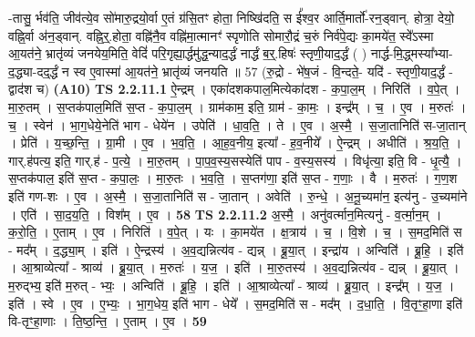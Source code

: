 \documentclass[17pt]{extarticle}
\begin{document}
                  \newline
                      -तासु॒ र्भव॑ति॒ जीव॑त्ये॒व सो॑मारु॒द्रयो॒र्वा ए॒तं ग्र॑सि॒तꣳ होता॒ निष्खि॑दति॒ स ई᳚श्व॒र आर्ति॒मार्तो॑-रन॒ड्वान्. होत्रा॒ देयो॒ वह्नि॒र्वा अ॑न॒ड्वान्. वह्नि॒र्॒.होता॒ वह्नि॑नै॒व वह्नि॑मा॒त्मानꣳ॑ स्पृणोति सोमारौ॒द्रं च॒रुं निर्व॑पे॒द्यः का॒मये॑त॒ स्वे᳚ऽस्मा आ॒यत॑ने॒ भ्रातृ॑व्यं जनयेय॒मिति॒ वेदिं॑ परि॒गृह्या॒र्द्धमु॑द्ध॒न्याद॒र्द्धं नार्द्धं ब॒र्॒.हिषः॑ स्तृणी॒याद॒र्द्धं ( ) नार्द्ध-मि॒द्ध्मस्या᳚भ्या-द॒द्ध्या-दद्॒र्द्धं न स्व ए॒वास्मा॑ आ॒यत॑ने॒ भ्रातृ॑व्यं जनयति ॥ 57 (रु॒द्रो - भे॑ष॒जं - वि॒न्दते॒- यदि॑ - स्तृणी॒याद॒र्द्धं - द्वाद॑श च)  \textbf{(A10)} \newline \newline
                                \textbf{ TS 2.2.11.1} \newline
                  ऐ॒न्द्रम् । एका॑दशकपाल॒मित्येका॑दश - क॒पा॒ल॒म् । निरिति॑ । व॒पे॒त् । मा॒रु॒तम् । स॒प्तक॑पाल॒मिति॑ स॒प्त - क॒पा॒ल॒म् । ग्राम॑काम॒ इति॒ ग्राम॑ - का॒मः॒ । इन्द्र᳚म् । च॒ । ए॒व । म॒रुतः॑ । च॒ । स्वेन॑ । भा॒ग॒धेये॒नेति॑ भाग - धेये॑न । उपेति॑ । धा॒व॒ति॒ । ते । ए॒व । अ॒स्मै॒ । स॒जा॒तानिति॑ स-जा॒तान् । प्रेति॑ । य॒च्छ॒न्ति॒ । ग्रा॒मी । ए॒व । भ॒व॒ति॒ । आ॒ह॒व॒नीय॒ इत्या᳚ - ह॒व॒नीये᳚ । ऐ॒न्द्रम् । अधीति॑ । श्र॒य॒ति॒ । गार्.ह॑पत्य॒ इति॒ गार्.ह॑ - प॒त्ये॒ । मा॒रु॒तम् । पा॒प॒व॒स्य॒सस्येति॑ पाप - व॒स्य॒सस्य॑ । विधृ॑त्या॒ इति॒ वि - धृ॒त्यै॒ । स॒प्तक॑पाल॒ इति॑ स॒प्त - क॒पा॒लः॒ । मा॒रु॒तः । भ॒व॒ति॒ । स॒प्तग॑णा॒ इति॑ स॒प्त - ग॒णाः॒ । वै । म॒रुतः॑ । ग॒ण॒श इति॑ गण-शः । ए॒व । अ॒स्मै॒ । स॒जा॒तानिति॑ स - जा॒तान् । अवेति॑ । रु॒न्धे॒ । अ॒नू॒च्यमा॑न॒ इत्य॑नु - उ॒च्यमा॑ने । एति॑ । सा॒द॒य॒ति॒ । विश᳚म् । ए॒व । \textbf{  58} \newline
                  \newline
                                \textbf{ TS 2.2.11.2} \newline
                  अ॒स्मै॒ । अनु॑वर्त्मान॒मित्यनु॑ - व॒र्त्मा॒न॒म् । क॒रो॒ति॒ । ए॒ताम् । ए॒व । निरिति॑ । व॒पे॒त् । यः । का॒मये॑त । क्ष॒त्राय॑ । च॒ । वि॒शे । च॒ । स॒मद॒मिति॑ स - मद᳚म् । द॒द्ध्या॒म् । इति॑ । ऐ॒न्द्रस्य॑ । अ॒व॒द्यन्नित्य॑व - द्यन्न् । ब्रू॒या॒त् । इन्द्रा॑य । अन्विति॑॑ । ब्रू॒हि॒ । इति॑ । आ॒श्राव्येत्या᳚ - श्राव्य॑ । ब्रू॒या॒त् । म॒रुतः॑ । य॒ज॒ । इति॑ । मा॒रु॒तस्य॑ । अ॒व॒द्यन्नित्य॑व - द्यन्न् । ब्रू॒या॒त् । म॒रुद्भ्य॒ इति॑ म॒रुत् - भ्यः॒ । अन्विति॑ । ब्रू॒हि॒ । इति॑ । आ॒श्राव्येत्या᳚ - श्राव्य॑ । ब्रू॒या॒त् । इन्द्र᳚म् । य॒ज॒ । इति॑ । स्वे । ए॒व । ए॒भ्यः॒ । भा॒ग॒धेय॒ इति॑ भाग - धेये᳚ । स॒मद॒मिति॑ स - मद᳚म् । द॒धा॒ति॒ । वि॒तृꣳ॒॒हा॒णा इति॑ वि-तृꣳ॒॒हा॒णाः । ति॒ष्ठ॒न्ति॒ । ए॒ताम् । ए॒व । \textbf{  59} \newline
\end{document}
